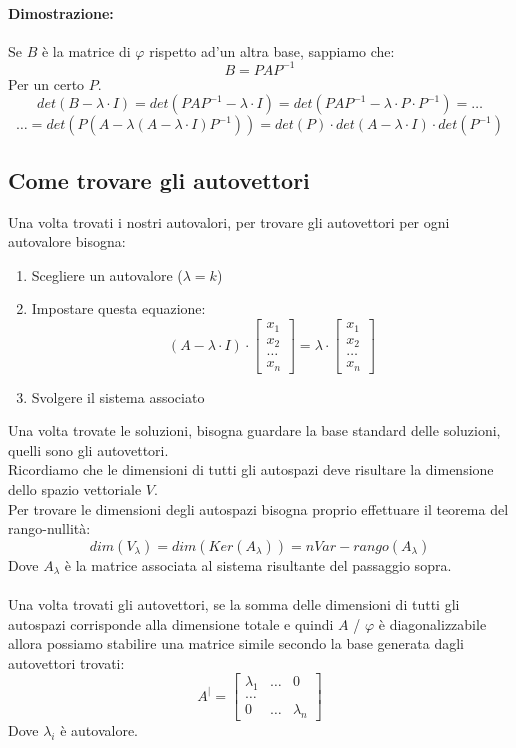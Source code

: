 \documentclass[12pt,a4paper]{article}
\begin{document}
\paragraph{Dimostrazione:} Se $B$ è la matrice di $\varphi$ rispetto ad'un altra base, sappiamo che:
\[
B = PAP^{-1}
\]
Per un certo $P$.
\[
det(B - \lambda \cdot I) = det(PAP^{-1} - \lambda \cdot I) = det(PAP^{-1} - \lambda \cdot P \cdot P^{-1}) = \ldots
\]
\[
\ldots = det(P(A - \lambda(A - \lambda \cdot I)P^{-1})) = det(P) \cdot det(A-\lambda \cdot I) \cdot det(P^{-1})
\]
\subsection{Come trovare gli autovettori}
Una volta trovati i nostri autovalori, per trovare gli autovettori per ogni autovalore bisogna:
\begin{enumerate}
  \item Scegliere un autovalore ($\lambda  = k$)
  \item Impostare questa equazione:
  \[
  (A - \lambda \cdot I) \cdot \begin{bmatrix}
    x_1\\
    x_2\\
    \ldots\\
    x_n
  \end{bmatrix} = \lambda \cdot \begin{bmatrix}
    x_1\\
    x_2\\
    \ldots\\
    x_n
  \end{bmatrix} 
  \]
  \item Svolgere il sistema associato
\end{enumerate}
Una volta trovate le soluzioni, bisogna guardare la base standard delle soluzioni, quelli sono gli autovettori.\\
Ricordiamo che le dimensioni di tutti gli autospazi deve risultare la dimensione dello spazio vettoriale $V$.\\
Per trovare le dimensioni degli autospazi bisogna proprio effettuare il teorema del rango-nullità:
\[
dim(V_{\lambda}) = dim(Ker(A_{\lambda})) = nVar - rango(A_{\lambda})
\]
Dove $A_{\lambda}$ è la matrice associata al sistema risultante del passaggio sopra.\\\\
Una volta trovati gli autovettori, se la somma delle dimensioni di tutti gli autospazi corrisponde alla dimensione totale e quindi $A$ / $\varphi$ è diagonalizzabile allora possiamo stabilire una matrice simile secondo la base generata dagli autovettori trovati:
\[
A^| = \begin{bmatrix}
  \lambda_1 & \ldots & 0\\
  \ldots\\
  0 & \ldots & \lambda_n
\end{bmatrix}
\]
Dove $\lambda_i$ è autovalore.
\end{document}
